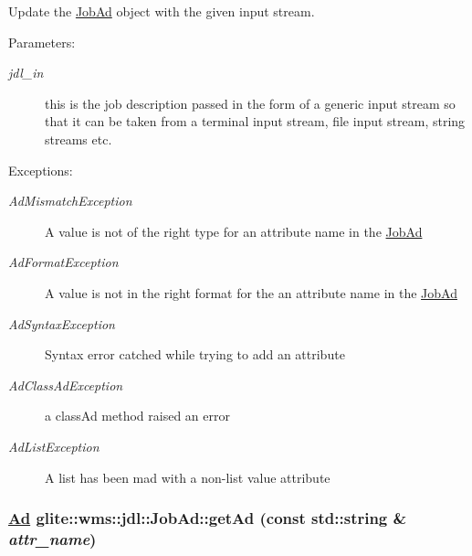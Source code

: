 Update the \hyperlink{classglite_1_1wms_1_1jdl_1_1JobAd}{Job\-Ad} object with the given input stream. \begin{Desc}
\item[Parameters:]
\begin{description}
\item[{\em jdl\_\-in}]this is the job description passed in the form of a generic input stream so that it can be taken from a terminal input stream, file input stream, string streams etc. \end{description}
\end{Desc}
\begin{Desc}
\item[Exceptions:]
\begin{description}
\item[{\em Ad\-Mismatch\-Exception}]A value is not of the right type for an attribute name in the \hyperlink{classglite_1_1wms_1_1jdl_1_1JobAd}{Job\-Ad} \item[{\em Ad\-Format\-Exception}]A value is not in the right format for the an attribute name in the \hyperlink{classglite_1_1wms_1_1jdl_1_1JobAd}{Job\-Ad} \item[{\em Ad\-Syntax\-Exception}]Syntax error catched while trying to add an attribute \item[{\em Ad\-Class\-Ad\-Exception}]a class\-Ad method raised an error \item[{\em Ad\-List\-Exception}]A list has been mad with a non-list value attribute \end{description}
\end{Desc}
\hypertarget{classglite_1_1wms_1_1jdl_1_1JobAd_z7_0}{
\subsubsection[getAd]{\setlength{\rightskip}{0pt plus 5cm}\hyperlink{classglite_1_1wms_1_1jdl_1_1Ad}{Ad} glite::wms::jdl::Job\-Ad::get\-Ad (const std::string \& {\em attr\_\-name})}}
\label{classglite_1_1wms_1_1jdl_1_1JobAd_z7_0}


